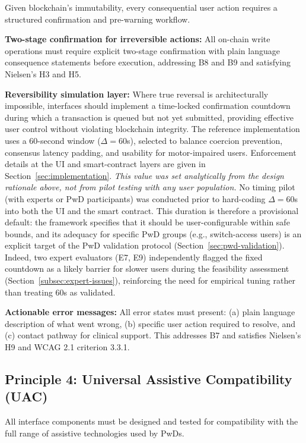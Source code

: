 \documentclass[journal,onecolumn]{IEEEtran}
\begin{document}
Given blockchain's immutability, every consequential user action requires a structured confirmation and pre-warning workflow.

\textbf{Two-stage confirmation for irreversible actions:} All on-chain write operations must require explicit two-stage confirmation with plain language consequence statements before execution, addressing B8 and B9 and satisfying Nielsen's H3 and H5.

\textbf{Reversibility simulation layer:} Where true reversal is architecturally impossible, interfaces should implement a time-locked confirmation countdown during which a transaction is queued but not yet submitted, providing effective user control without violating blockchain integrity. The reference implementation uses a 60-second window ($\Delta = 60$s), selected to balance coercion prevention, consensus latency padding, and usability for motor-impaired users. Enforcement details at the UI and smart-contract layers are given in Section~\ref{sec:implementation}. \emph{This value was set analytically from the design rationale above, not from pilot testing with any user population.} No timing pilot (with experts or PwD participants) was conducted prior to hard-coding $\Delta = 60$s into both the UI and the smart contract. This duration is therefore a provisional default: the framework specifies that it should be user-configurable within safe bounds, and its adequacy for specific PwD groups (e.g., switch-access users) is an explicit target of the PwD validation protocol (Section~\ref{sec:pwd-validation}). Indeed, two expert evaluators (E7, E9) independently flagged the fixed countdown as a likely barrier for slower users during the feasibility assessment (Section~\ref{subsec:expert-issues}), reinforcing the need for empirical tuning rather than treating 60s as validated.

\textbf{Actionable error messages:} All error states must present: (a) plain language description of what went wrong, (b) specific user action required to resolve, and (c) contact pathway for clinical support. This addresses B7 and satisfies Nielsen's H9 and WCAG 2.1 criterion 3.3.1.

\subsection{Principle 4: Universal Assistive Compatibility (UAC)}

All interface components must be designed and tested for compatibility with the full range of assistive technologies used by PwDs.
\end{document}
